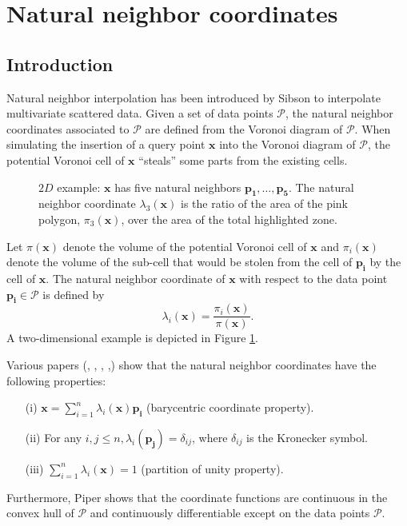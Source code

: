 \section{Natural neighbor coordinates}\label{sec:coordinates}
\subsection{Introduction}
Natural neighbor interpolation has been introduced by Sibson
\cite{s-bdnni-81} to interpolate multivariate scattered data.  Given
a set of data points $\mathcal{P}$, the natural neighbor coordinates
associated to $\mathcal{P}$ are defined from the Voronoi diagram of
$\mathcal{P}$.  When simulating the insertion of a query point
$\mathbf{x}$ into the Voronoi diagram of $\mathcal{P}$, the potential
Voronoi cell of $\mathbf{x}$ ``steals'' some parts from the existing
cells. 
\begin{figure}[ht!]
\begin{center}
   
\end{center}
\caption{$2D$ example: $\mathbf{x}$ has five natural neighbors 
  $\mathbf{p_1},\ldots , \mathbf{p_5}$. 
  The natural neighbor coordinate $\lambda_3(\mathbf{x})$ is the ratio
  of the area of the pink polygon, $\pi_3(\mathbf{x})$, over the area
  of the total highlighted zone.
  \label{fig:nn_coords}}
\end{figure}
Let $\pi(\mathbf{x})$ denote the volume of the potential Voronoi cell
of $\mathbf{x}$ and $\pi_i(\mathbf{x})$ denote the volume of the
sub-cell that would be stolen from the cell of $\mathbf{p_i}$ by the
cell of $\mathbf{x}$.  The natural neighbor coordinate of $\mathbf{x}$
with respect to the data point $\mathbf{p_i}\in \mathcal{P}$ is defined by
$$
\lambda_i(\mathbf{x}) =
\frac{\pi_i(\mathbf{x})}{\pi(\mathbf{x})}.$$
A two-dimensional example
is depicted in Figure \ref{fig:nn_coords}.


Various papers (\cite{s-vidt-80}, \cite{f-sodt-90},
\cite{cgal:p-plcbd-93}, \cite{b-scaps-97},\cite{hs-vbihc-00}) show that
the natural neighbor coordinates have the following properties:
  \begin{itemize}
  \item[(i)] $\mathbf{x} = \sum_{i=1}^n \lambda_i(\mathbf{x}) \mathbf{p_i}$
    (barycentric coordinate property).
  \item[(ii)] For any $i,j \leq n, \lambda_i(\mathbf{p_j})=
    \delta_{ij}$, where $\delta_{ij}$ is the Kronecker symbol.
  \item[(iii)] $\sum_{i=1}^n \lambda_i(\mathbf{x}) = 1$ (partition of unity
    property).
  \end{itemize}
  Furthermore, Piper \cite{cgal:p-plcbd-93} shows that the coordinate
  functions are continuous in the convex hull of $\mathcal{P}$ and
  continuously differentiable except on the data points $\mathcal{P}$.
  \medskip
  
